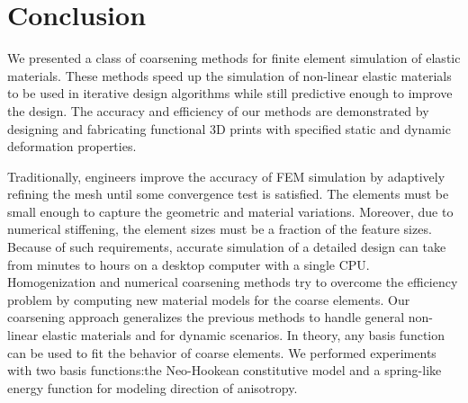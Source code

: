 \chapter{Conclusion}
We presented a class of coarsening methods for finite element simulation of elastic materials.
These methods speed up the simulation of non-linear elastic materials to be used in iterative design algorithms while still predictive enough to improve the design.
The accuracy and efficiency of our methods are demonstrated by designing and fabricating functional 3D prints with specified static and dynamic deformation properties.

Traditionally, engineers improve the accuracy of FEM simulation by adaptively refining the mesh until some convergence test is satisfied.
The elements must be small enough to capture the geometric and material variations.
Moreover, due to numerical stiffening, the element sizes must be a fraction of the feature sizes.
Because of such requirements, accurate simulation of a detailed design can take from minutes to hours on a desktop computer with a single CPU.
Homogenization and numerical coarsening methods try to overcome the efficiency problem by computing new material models for the coarse elements.
Our coarsening approach generalizes the previous methods to handle general non-linear elastic materials and for dynamic scenarios. In theory, any basis function can be used to fit the behavior of coarse elements. We performed experiments with two basis functions:the Neo-Hookean constitutive model and a spring-like energy function for modeling direction of anisotropy.

